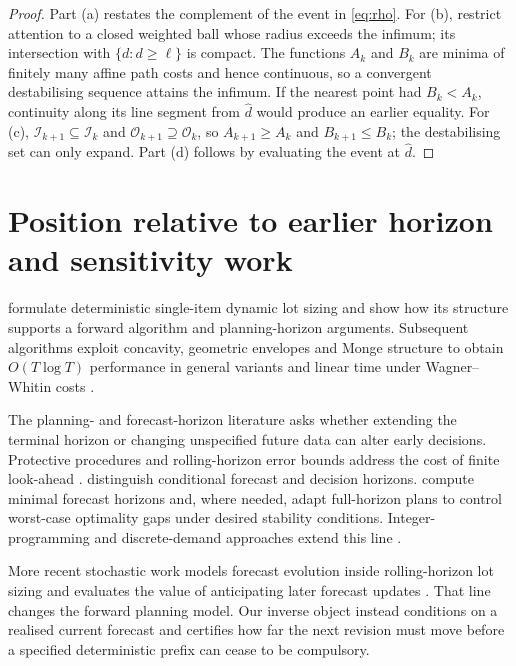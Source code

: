 \documentclass[11pt]{article}
\theoremstyle{definition}
\newcommand{\cI}{\mathcal{I}}
\newcommand{\cO}{\mathcal{O}}
\newcommand{\dhat}{\widehat d}
\newcommand{\ellv}{\ell}
\begin{document}
\begin{proof}
Part (a) restates the complement of the event in \eqref{eq:rho}. For (b), restrict attention to a closed weighted ball whose radius exceeds the infimum; its intersection with $\{d:d\ge\ellv\}$ is compact. The functions $A_k$ and $B_k$ are minima of finitely many affine path costs and hence continuous, so a convergent destabilising sequence attains the infimum. If the nearest point had $B_k<A_k$, continuity along its line segment from $\dhat$ would produce an earlier equality. For (c), $\cI_{k+1}\subseteq\cI_k$ and $\cO_{k+1}\supseteq\cO_k$, so $A_{k+1}\ge A_k$ and $B_{k+1}\le B_k$; the destabilising set can only expand. Part (d) follows by evaluating the event at $\dhat$.
\end{proof}

\section{Position relative to earlier horizon and sensitivity work}

\textcite{WagnerWhitin1958} formulate deterministic single-item dynamic lot sizing and show how its structure supports a forward algorithm and planning-horizon arguments. Subsequent algorithms exploit concavity, geometric envelopes and Monge structure to obtain $O(T\log T)$ performance in general variants and linear time under Wagner--Whitin costs \parencite{FedergruenTzur1991,WagelmansEtAl1992,AggarwalPark1993}.

The planning- and forecast-horizon literature asks whether extending the terminal horizon or changing unspecified future data can alter early decisions. Protective procedures and rolling-horizon error bounds address the cost of finite look-ahead \parencite{EppenEtAl1969,LundinMorton1975,LeeDenardo1986}. \textcite{BesSethi1988} distinguish conditional forecast and decision horizons. \textcite{FedergruenTzur1994,FedergruenTzur1995} compute minimal forecast horizons and, where needed, adapt full-horizon plans to control worst-case optimality gaps under desired stability conditions. Integer-programming and discrete-demand approaches extend this line \parencite{DawandeEtAl2006,DawandeEtAl2007}.

More recent stochastic work models forecast evolution inside rolling-horizon lot sizing and evaluates the value of anticipating later forecast updates \parencite{ForelGrunow2023}. That line changes the forward planning model. Our inverse object instead conditions on a realised current forecast and certifies how far the next revision must move before a specified deterministic prefix can cease to be compulsory.
\end{document}
